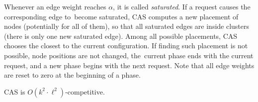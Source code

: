 \documentclass[a4paper,anonymous,USenglish]{lipics-v2019}
\newcommand{\DET}{\textsf{CAS}\xspace}
\begin{document}
Whenever an edge weight reaches $\alpha$, it is called \emph{saturated}. If a
request causes the corresponding edge to~become saturated,
\DET computes a new placement of nodes (potentially for all of them), so that all
saturated edges are inside clusters (there is only one new saturated edge).
Among all possible placements, \DET chooses the closest to the current
configuration. If finding such placement
is not possible, node positions are not changed, the~current phase ends
with the current request, and a new phase begins with the next request. Note
that all edge weights are reset to zero at the beginning of a phase.


\begin{theorem}
\DET is $O(k^2 \cdot \ell^2)$-competitive.
\label{th:detsqare}
\end{theorem}
\end{document}
